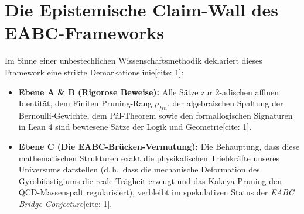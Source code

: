 \documentclass[11pt,a4paper]{article}
\begin{document}
	\section{Die Epistemische Claim-Wall des EABC-Frameworks}
	Im Sinne einer unbestechlichen Wissenschaftsmethodik deklariert dieses Framework eine strikte Demarkationslinie[cite: 1]:
	\begin{itemize}
		\item \textbf{Ebene A \& B (Rigorose Beweise):} Alle Sätze zur 2-adischen affinen Identität, dem Finiten Pruning-Rang $\rho_{fin}$, der algebraischen Spaltung der Bernoulli-Gewichte, dem Pál-Theorem sowie den formallogischen Signaturen in Lean 4 sind bewiesene Sätze der Logik und Geometrie[cite: 1].
		\item \textbf{Ebene C (Die EABC-Brücken-Vermutung):} Die Behauptung, dass diese mathematischen Strukturen exakt die physikalischen Triebkräfte unseres Universums darstellen (d.\,h.~dass die mechanische Deformation des Gyrobifastigiums die reale Trägheit erzeugt und das Kakeya-Pruning den QCD-Massenspalt regularisiert), verbleibt im spekulativen Status der \textit{EABC Bridge Conjecture}[cite: 1].
	\end{itemize}
	
\end{document}
